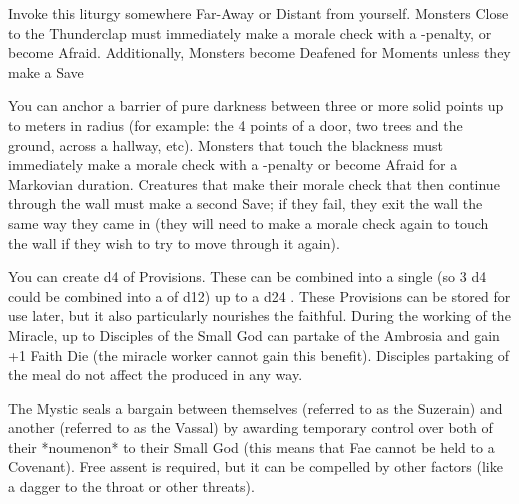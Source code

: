 {\LITURGY [
  Name= Thunderclap,
  Link=xibalba-liturgy-thunderclap,
  Paradigm= Elements ,
  Save=  Y (negates Deafness) ,
  Duration= 0 ,
  Counter=  n/a  ,
  Keywords= None ,
  Target=   Far-Away or Distant area
]



Invoke this liturgy somewhere Far-Away or Distant from yourself.  Monsters Close to the Thunderclap must immediately make a morale check with a -\DICE penalty, or become Afraid.  Additionally, Monsters become Deafened for \DICE Moments unless they make a Save

\LITURGY [
  Name= Wall of Gloom,
  Link=xibalba-liturgy-wall of gloom,
  Paradigm= Mind ,
  Save=  Y (see description) ,
  Duration= Markovian ,
  Counter=  n/a  ,
  Keywords= None ,
  Target=   Nearby or Far-Away area
]



You can anchor a barrier of pure darkness between three or more solid points up to \DICE meters in radius (for example: the 4 points of a door, two trees and the ground, across a hallway, etc).  Monsters that touch the blackness must immediately make a morale check with a -\DICE penalty or become Afraid for a Markovian duration.  Creatures that make their morale check that then continue through the wall must make a second Save; if they fail, they exit the wall the same way they came in (they will need to make a morale check again to touch the wall if they wish to try to move through it again).   

\newpage







You can create \DICE d4 \UD of Provisions.  These \UD can be combined into a single \UD (so 3 d4 \UD could be combined into a \UD of d12) up to a d24 \UD.  These Provisions can be stored for use later, but it also particularly nourishes the faithful.  During the working of the Miracle, up to \DICE Disciples of the Small God can partake of the Ambrosia and gain +1 Faith Die (the miracle worker cannot gain this benefit). Disciples partaking of the meal do not affect the \UD produced in any way.



The Mystic seals a bargain between themselves (referred to as the Suzerain) and another (referred to as the Vassal) by awarding temporary control over both of their *noumenon* to their Small God (this means that Fae cannot be held to a Covenant).  Free assent is required, but it can be compelled by other factors (like a dagger to the throat or other threats).

}
